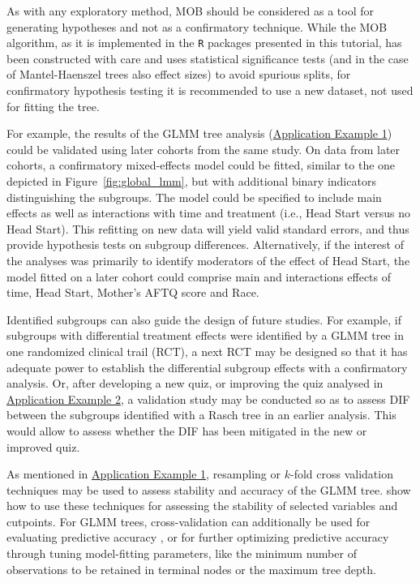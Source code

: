 \documentclass[doc,floatsintext,natbib]{apa7}
\begin{document}
As with any exploratory method, MOB should be considered as a tool for generating hypotheses and not as a confirmatory technique. While the MOB algorithm, as it is implemented in the \texttt{R} packages presented in this tutorial, has been constructed with care and uses statistical significance tests (and in the case of Mantel-Haenszel trees also effect sizes) to avoid spurious splits, for confirmatory hypothesis testing it is recommended to use a new dataset, not used for fitting the tree. 

For example, the results of the GLMM tree analysis (\hyperref[sec:TutorialMixed]{Application Example 1}) could be validated using later cohorts from the same study. On data from later cohorts, a confirmatory mixed-effects model could be fitted, similar to the one depicted in Figure~\ref{fig:global_lmm}, but with additional binary indicators distinguishing the subgroups. The model could be specified to include main effects as well as interactions with time and treatment (i.e., Head Start versus no Head Start). This refitting on new data will yield valid standard errors, and thus provide hypothesis tests on subgroup differences. Alternatively, if the interest of the analyses was primarily to identify moderators of the effect of Head Start, the model fitted on a later cohort could comprise main and interactions effects of time, Head Start, Mother's AFTQ score and Race. 

Identified subgroups can also guide the design of future studies. For example, if subgroups with differential treatment effects were identified by a GLMM tree in one randomized clinical trail (RCT), a next RCT may be designed so that it has adequate power to establish the differential subgroup effects with a confirmatory analysis. Or, after developing a new quiz, or improving the quiz analysed in \hyperref[sec:TutorialRasch]{Application Example 2}, a validation study may be conducted so as to assess DIF between the subgroups identified with a Rasch tree in an earlier analysis. This would allow to assess whether the DIF has been mitigated in the new or improved quiz.

As mentioned in \hyperref[sec:TutorialMixed]{Application Example 1}, resampling or $k$-fold cross validation techniques may be used to assess stability and accuracy of the GLMM tree. \cite{PhilyRusc18} show how to use these techniques for assessing the stability of selected variables and cutpoints. For GLMM trees, cross-validation can additionally be used for evaluating predictive accuracy \citep[e.g., ][]{RooiyWeed20}, or for further optimizing predictive accuracy through tuning model-fitting parameters, like the minimum number of observations to be retained in terminal nodes or the maximum tree depth.  
\end{document}
